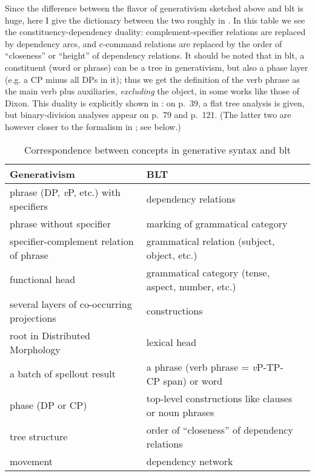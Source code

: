 \documentclass[UTF8, a4paper, oneside, scheme=plain, 12pt]{ctexbook}
\newcommand*{\citepage}[1]{p.~{#1}}
\newcommand{\vP}{\textit{v}P}
\begin{document}
{Since the difference between the flavor of generativism sketched above 
and \ac{blt} is huge, 
here I give the dictionary between the two roughly in .
In this table we see the constituency-dependency duality:
complement-specifier relations are replaced by dependency arcs,
and c-command relations are replaced by the order of ``closeness'' or ``height''
of dependency relations.
It should be noted that in \ac{blt}, 
a constituent (word or phrase) can be a tree in generativism,
but also a phase layer (e.g. a CP minus all DPs in it);
thus we get the definition of the verb phrase 
as the main verb plus auxiliaries, \emph{excluding} the object, 
in some works like those of Dixon. 
This duality is explicitly shown in \citet{quirk1985}:
on \citepage{39}, a flat tree analysis is given,
but binary-division analyses appear on \citepage{79} and \citepage{121}.
(The latter two are however closer to the formalism in \citet{cgel}; see below.)

\begin{table}[H]
    \caption{Correspondence between concepts in generative syntax and \acs{blt}}
    \label{tbl:theory.blt}
    \centering
    \small
    \begin{tabular}{@{}lll@{}}
    \toprule
    Generativism                               & BLT                                          \\ \midrule
    phrase (DP, \vP, etc.) with specifiers     & dependency relations                          \\
    phrase without specifier                   & marking of grammatical category               \\
    specifier-complement relation of phrase    & grammatical relation (subject, object, etc.)  \\
    functional head                            & grammatical category (tense, aspect, number,  etc.)                         \\
    several layers of co-occurring projections & constructions                                 \\
    root in Distributed Morphology             & lexical head                                          \\
    a batch of spellout result                 & a phrase (verb phrase = \vP-TP-CP span) or word    \\
    phase (DP or CP)                           & top-level constructions like clauses or noun phrases                        \\
    tree structure                             & order of ``closeness'' of dependency relations  \\
    movement                                   & dependency network                            \\ \bottomrule
    \end{tabular}
\end{table}

}
\end{document}

